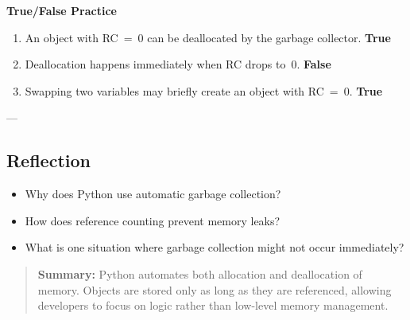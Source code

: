 \textbf{True/False Practice}
\begin{enumerate}
  \item An object with RC~=~0 can be deallocated by the garbage collector. \textbf{True}
  \item Deallocation happens immediately when RC drops to~0. \textbf{False}
  \item Swapping two variables may briefly create an object with RC~=~0. \textbf{True}
\end{enumerate}

---

\subsection*{Reflection}

\begin{itemize}
  \item Why does Python use automatic garbage collection?
  \item How does reference counting prevent memory leaks?
  \item What is one situation where garbage collection might not occur immediately?
\end{itemize}

\begin{quote}
\textbf{Summary:}  
Python automates both allocation and deallocation of memory.
Objects are stored only as long as they are referenced, allowing developers to focus on
logic rather than low-level memory management.
\end{quote}

